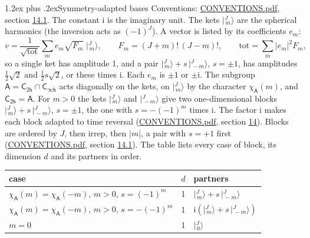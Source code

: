 \documentclass[10pt,a4paper]{article}
\makeatletter
\renewcommand\section{\@startsection{section}{1}{\z@}{-3ex plus -1ex minus -.2ex}%
  {1.2ex plus .2ex}{\normalfont\large\sffamily\bfseries\color{parttitle}}}
\numberwithin{equation}{section}
\newcommand{\grp}[1]{\mathsf{#1}}
\newcommand{\iunit}{\mathrm{i}}
\newcommand{\chiA}{\chi_{\grp{A}}}
\newcommand{\jm}[2]{\bigl\lvert{}^{#1}_{\,#2}\bigr\rangle}
\makeatother
\begin{document}
\section{Symmetry-adapted bases}\label{s:bases}
Conventions: \href{../../CONVENTIONS.pdf}{CONVENTIONS.pdf}, section \href{../../CONVENTIONS.pdf\#conv.14.1}{14.1}.
The constant $\iunit$ is the imaginary unit.
\leavevmode\label{n:index.m}\label{n:vector.ket}The kets $\jm{J}{m}$ are the spherical harmonics (the inversion acts as $(-1)^J$). \label{n:index.ketcoefficient}\label{n:vector.basis.symmetry}\label{n:index.ketweight}\label{n:index.total}A vector is listed by its coefficients $e_m$:
\begin{equation}\label{e:ket}v = \frac{1}{\sqrt{\mathrm{tot}}}\sum_m e_m\sqrt{F_m}\;\jm{J}{m},\qquad F_m = (J+m)!\,(J-m)!,\qquad \mathrm{tot} = \sum_m |e_m|^2F_m,\end{equation}
\leavevmode\label{n:index.pair.sign}so a single ket has amplitude 1, and a pair $\jm{J}{m} + s\,\jm{J}{-m}$, $s = \pm1$, has amplitudes $\tfrac{1}{2}\sqrt{2}$ and $\tfrac{1}{2}s\sqrt{2}$, or these times $\iunit$. Each $e_m$ is $\pm1$ or $\pm\iunit$.
\leavevmode\label{n:group.A}\label{n:function.character.abelian}The subgroup $\grp{A} = \grp{C_{2h}}\cap\grp{C_{\infty h}}$ acts diagonally on the kets, on $\jm{J}{m}$ by the character $\chiA(m)$, and $\grp{C_{2h}} = \grp{A}$. For $m > 0$ the kets $\jm{J}{m}$ and $\jm{J}{-m}$ give two one-dimensional blocks $\jm{J}{m} + s\,\jm{J}{-m}$, $s = \pm1$, the one with $s = -(-1)^m$ times $\iunit$. The factor $\iunit$ makes each block adapted to time reversal (\href{../../CONVENTIONS.pdf}{CONVENTIONS.pdf}, section \href{../../CONVENTIONS.pdf\#conv.14}{14}). Blocks are ordered by $J$, then irrep, then $|m|$, a pair with $s = +1$ first (\href{../../CONVENTIONS.pdf}{CONVENTIONS.pdf}, section \href{../../CONVENTIONS.pdf\#conv.14.1}{14.1}).
\leavevmode\label{n:head.case}\label{n:head.partners}The table lists every case of block, its dimension $d$ and its partners in order.
\begin{center}\begin{tabular}{@{}lrl@{}}\toprule
case & $d$ & partners\\\midrule
$\chiA(m) = \chiA(-m)$, $m > 0$, $s = (-1)^m$ & 1 & $\jm{J}{m} + s\,\jm{J}{-m}$\\
$\chiA(m) = \chiA(-m)$, $m > 0$, $s = -(-1)^m$ & 1 & $\iunit(\jm{J}{m} + s\,\jm{J}{-m})$\\
$m = 0$ & 1 & $\jm{J}{0}$\\
\bottomrule\end{tabular}\end{center}
\end{document}
